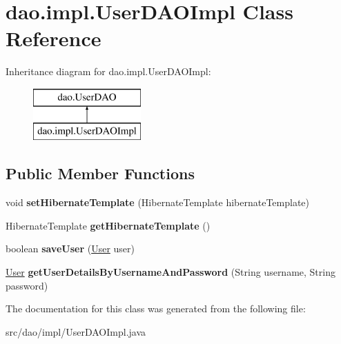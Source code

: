 \hypertarget{classdao_1_1impl_1_1_user_d_a_o_impl}{}\section{dao.\+impl.\+User\+D\+A\+O\+Impl Class Reference}
\label{classdao_1_1impl_1_1_user_d_a_o_impl}
Inheritance diagram for dao.\+impl.\+User\+D\+A\+O\+Impl\+:\begin{figure}[H]
\begin{center}
\leavevmode
\includegraphics[height=2.000000cm]{classdao_1_1impl_1_1_user_d_a_o_impl}
\end{center}
\end{figure}
\subsection*{Public Member Functions}
\begin{DoxyCompactItemize}
\item 
\mbox{\label{classdao_1_1impl_1_1_user_d_a_o_impl_a73d10aae918da3e5de10052c3b36665c}} 
void {\bfseries set\+Hibernate\+Template} (Hibernate\+Template hibernate\+Template)
\item 
\mbox{\label{classdao_1_1impl_1_1_user_d_a_o_impl_acf4d0494ed9bb7d9dd049f1ea10328a4}} 
Hibernate\+Template {\bfseries get\+Hibernate\+Template} ()
\item 
\mbox{\label{classdao_1_1impl_1_1_user_d_a_o_impl_a859e94509e4fb4372be8e0e2fa2ab4ab}} 
boolean {\bfseries save\+User} (\mbox{\hyperlink{classmodel_1_1_user}{User}} user)
\item 
\mbox{\label{classdao_1_1impl_1_1_user_d_a_o_impl_a15e2d9e735ce7d780024e14fe735c7e9}} 
\mbox{\hyperlink{classmodel_1_1_user}{User}} {\bfseries get\+User\+Details\+By\+Username\+And\+Password} (String username, String password)
\end{DoxyCompactItemize}


The documentation for this class was generated from the following file\+:\begin{DoxyCompactItemize}
\item 
src/dao/impl/User\+D\+A\+O\+Impl.\+java\end{DoxyCompactItemize}
